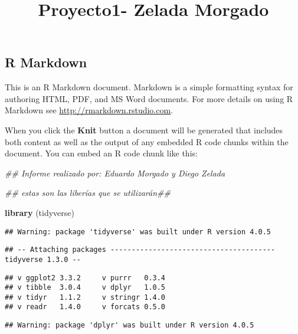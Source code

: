\documentclass[
]{article}
\title{Proyecto1- Zelada Morgado}
\author{}
\date{\vspace{-2.5em}}
\newenvironment{Shaded}{\begin{snugshade}}{\end{snugshade}}
\newcommand{\CommentTok}[1]{\textcolor[rgb]{0.56,0.35,0.01}{\textit{#1}}}
\newcommand{\KeywordTok}[1]{\textcolor[rgb]{0.13,0.29,0.53}{\textbf{#1}}}
\newcommand{\NormalTok}[1]{#1}
\begin{document}
\maketitle

\hypertarget{r-markdown}{%
\subsection{R Markdown}\label{r-markdown}}

This is an R Markdown document. Markdown is a simple formatting syntax
for authoring HTML, PDF, and MS Word documents. For more details on
using R Markdown see \url{http://rmarkdown.rstudio.com}.

When you click the \textbf{Knit} button a document will be generated
that includes both content as well as the output of any embedded R code
chunks within the document. You can embed an R code chunk like this:

\begin{Shaded}
\begin{Highlighting}[]
\CommentTok{## Informe realizado por: Eduardo Morgado y Diego Zelada }









\CommentTok{## estas son las liberías que se utilizarán##}

\KeywordTok{library}\NormalTok{ (tidyverse)}
\end{Highlighting}
\end{Shaded}

\begin{verbatim}
## Warning: package 'tidyverse' was built under R version 4.0.5
\end{verbatim}

\begin{verbatim}
## -- Attaching packages --------------------------------------- tidyverse 1.3.0 --
\end{verbatim}

\begin{verbatim}
## v ggplot2 3.3.2     v purrr   0.3.4
## v tibble  3.0.4     v dplyr   1.0.5
## v tidyr   1.1.2     v stringr 1.4.0
## v readr   1.4.0     v forcats 0.5.0
\end{verbatim}

\begin{verbatim}
## Warning: package 'dplyr' was built under R version 4.0.5
\end{verbatim}
\end{document}
